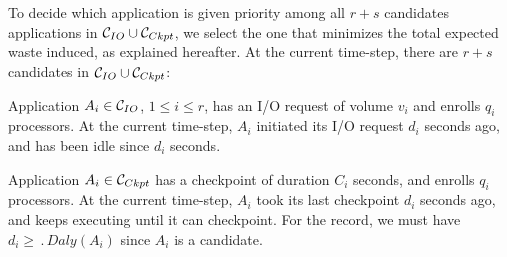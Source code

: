 To decide which application is given priority among all $r+s$ candidates
applications in $\mathcal{C}_{IO} \cup \mathcal{C}_{Ckpt}$, we select the one that
minimizes the total expected waste induced, as explained hereafter.
At the current time-step, there are $r+s$ candidates in $\mathcal{C}_{IO} \cup \mathcal{C}_{Ckpt}$:
\begin{compactitem}
%
  \item Application $A_{i} \in \mathcal{C}_{IO}$, $1\leq i \leq r$, has an I/O request
  of volume $v_{i}$ and enrolls $q_{i}$ processors. At the current time-step,
  $A_{i}$ initiated its I/O request $d_{i}$ seconds ago, and has been idle since
  $d_{i}$ seconds.
%
 \item Application $A_{i} \in  \mathcal{C}_{Ckpt}$ has a checkpoint of duration $C_{i}$
 seconds, and enrolls $q_{i}$ processors. At the current time-step, $A_{i}$ took
 its last checkpoint $d_{i}$ seconds ago, and keeps executing until it can
 checkpoint. For the record, we must have $d_{i} \geq \period{Daly}(A_{i})$
 since $A_{i}$ is a candidate.
%
\end{compactitem}

